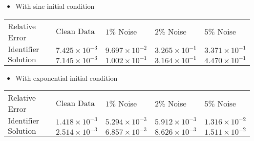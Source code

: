 \documentclass[12pt]{article}
\begin{document}
\begin{itemize}
    \item With sine initial condition 
\end{itemize}
	\tabulinesep=4mm
	{ \large  }
	\vspace{3mm}
	\begin{tabu} to \linewidth { | X[c] | X[c] | X[c] | X[c] | X[c] | }
		 \hline
		\everyrow{\hline}
		Relative Error	& $\text{Clean Data}$ & $1 \%$ Noise & $2 \%$ Noise & $5 \%$ Noise \\
		$\text{Identifier}$ & $7.425 \times 10^{-3}$  & $9.697 \times 10^{-2}$   & $3.265 \times 10^{-1}$  & $3.371 \times 10^{-1}$ \\
		$\text{Solution}$ & $7.145 \times 10^{-3}$ &  $1.002 \times 10^{-1}$ & $3.164 \times 10^{-1}$    &  $4.470 \times 10^{-1}$  \\
	\end{tabu}



\begin{itemize}
    \item With exponential initial condition 
\end{itemize}
	\tabulinesep=4mm
	{ \large  }
	\vspace{3mm}
	\begin{tabu} to \linewidth { | X[c] | X[c] | X[c] | X[c] | X[c] | }
		 \hline
		\everyrow{\hline}
		Relative Error	& $\text{Clean Data}$ & $1 \%$ Noise & $2 \%$ Noise & $5 \%$ Noise \\
		$\text{Identifier}$ & $1.418 \times 10^{-3}$  & $5.294 \times 10^{-3}$   & $5.912 \times 10^{-3}$  & $1.316 \times 10^{-2}$ \\
		$\text{Solution}$ & $2.514 \times 10^{-3}$ &  $6.857 \times 10^{-3}$ & $8.626 \times 10^{-3}$    &  $1.511 \times 10^{-2}$  \\
	\end{tabu}
\end{document}

